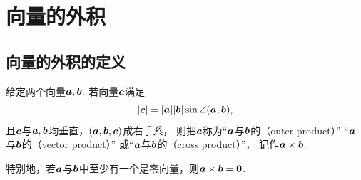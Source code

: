 \section{向量的外积}
\subsection{向量的外积的定义}
\begin{definition}
给定两个向量\(\boldsymbol{a},\boldsymbol{b}\).
若向量\(\boldsymbol{c}\)满足
\begin{equation}\label{equation:解析几何.向量外积的长度关系}
	\abs{\boldsymbol{c}}
	= \abs{\boldsymbol{a}} \abs{\boldsymbol{b}} \sin\angle(\boldsymbol{a},\boldsymbol{b}),
\end{equation}
且\(\boldsymbol{c}\)与\(\boldsymbol{a},\boldsymbol{b}\)均垂直，\((\boldsymbol{a},\boldsymbol{b},\boldsymbol{c})\)成右手系，
则把\(\boldsymbol{c}\)称为“\(\boldsymbol{a}\)与\(\boldsymbol{b}\)的（outer product）”
“\(\boldsymbol{a}\)与\(\boldsymbol{b}\)的（vector product）”
或“\(\boldsymbol{a}\)与\(\boldsymbol{b}\)的（cross product）”，
记作\(\boldsymbol{a}\times\boldsymbol{b}\).

特别地，若\(\boldsymbol{a}\)与\(\boldsymbol{b}\)中至少有一个是零向量，则\(\boldsymbol{a}\times\boldsymbol{b}=\boldsymbol{0}\).
\end{definition}

